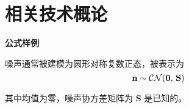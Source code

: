 
\chapter{相关技术概论}
\label{chap02}
\sloppy{}

\textbf{公式样例}

噪声通常被建模为圆形对称复数正态，被表示为
\begin{equation}
\setlength{\abovedisplayskip}{3pt}
\setlength{\belowdisplayskip}{3pt}
{\mathbf  {n}}\sim {\mathcal  {CN}}({\mathbf  {0}},\,{\mathbf  {S}})
\end{equation}

其中均值为零，噪声协方差矩阵为 $\mathbf  {S}$ 是已知的。






